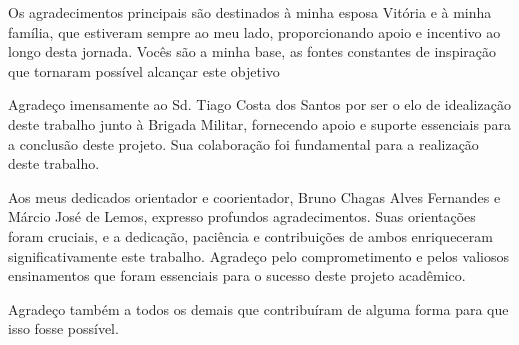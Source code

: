 \begin{agradecimentos}
    Os agradecimentos principais são destinados à minha esposa Vitória e à minha família, que estiveram sempre ao meu lado, proporcionando apoio e incentivo ao longo desta jornada. Vocês são a minha base, as fontes constantes de inspiração que tornaram possível alcançar este objetivo
    
    Agradeço imensamente ao Sd. Tiago Costa dos Santos por ser o elo de idealização deste trabalho junto à Brigada Militar, fornecendo apoio e suporte essenciais para a conclusão deste projeto. Sua colaboração foi fundamental para a realização deste trabalho.

    Aos meus dedicados orientador e coorientador, Bruno Chagas Alves Fernandes e Márcio José de Lemos, expresso profundos agradecimentos. Suas orientações foram cruciais, e a dedicação, paciência e contribuições de ambos enriqueceram significativamente este trabalho. Agradeço pelo comprometimento e pelos valiosos ensinamentos que foram essenciais para o sucesso deste projeto acadêmico.

    Agradeço também a todos os demais que contribuíram de alguma forma para que isso fosse possível.




\end{agradecimentos}